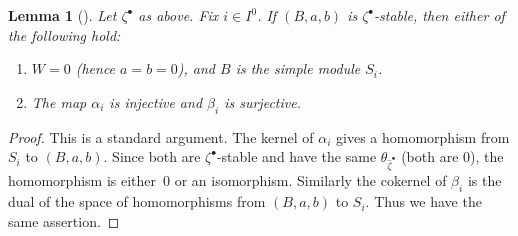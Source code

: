 \documentclass[10pt,a4paper]{amsart}
\newenvironment{aenume}{%
  \begin{enumerate}%
  \renewcommand{\theenumi}{\alph{enumi}}%
  \renewcommand{\labelenumi}{\textup{(\theenumi)}}%
  }{\end{enumerate}}
\newtheorem{Lemma}[equation]{Lemma}
\theoremstyle{definition}
\numberwithin{equation}{section}
\begin{document}
\begin{Lemma}[]\label{lem:betasurj}
  Let $\zeta^\bullet$ as above. Fix $i\in I^0$. If $(B,a,b)$ is
  $\zeta^\bullet$-stable, then either of the following hold\textup:
  \begin{aenume}\itemsep=0pt
  \item $W = 0$ \textup(hence $a = b = 0$\textup), and $B$ is the simple
    module $S_i$.

  \item The map $\alpha_i$ is injective and $\beta_i$ is
    surjective.
  \end{aenume}
\end{Lemma}

\begin{proof}
  This is a standard argument. The kernel of $\alpha_i$ gives a
  homomorphism from $S_i$ to $(B,a,b)$. Since both are
  $\zeta^\bullet$-stable and have the same
  $\theta_{\widehat\zeta^\bullet}$ (both are $0$), the homomorphism is
  \mbox{either}~$0$ or an isomorphism. Similarly the cokernel of $\beta_i$ is
  the dual of the space of homomorphisms from $(B,a,b)$ to $S_i$. Thus
  we have the same assertion.
\end{proof}
\end{document}
